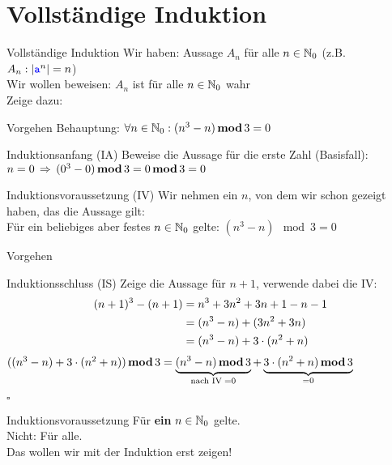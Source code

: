 \section{Vollständige Induktion}

\morescalingdelimiters

\begin{frame}{Vollständige Induktion}
	Wir haben: Aussage $A_n$ für alle $n \in \mathbb{N}_0$ (z.B. $A_n: \left\lvert \hbox{\textcolor{blue}{\texttt{a}}}^n \right\rvert = n$) \\
	Wir wollen beweisen: $A_n$ ist für alle $n \in \mathbb{N}_0$ wahr \\[0.5em]
	Zeige dazu: 
\end{frame}

\begin{frame}{Vorgehen}
	Behauptung: $\forall n \in \mathbb{N}_0: (n^3 - n) \mathop{\textbf{mod}} 3 = 0$
	\begin{block}{Induktionsanfang (IA)}
		Beweise die Aussage für die erste Zahl (Basisfall):\\
		$n = 0 \impl (0^3 - 0) \mod 3 = 0 \mod 3 = 0$
	\end{block}
	\begin{block}{Induktionsvoraussetzung (IV)}
		Wir nehmen ein $n$, von dem wir schon gezeigt haben, das die Aussage gilt:\\
		Für ein beliebiges aber festes $n \in \mathbb{N}_0$ gelte: $(n^3 - n) \mod 3 = 0$
	\end{block}
\end{frame}

\begin{frame}{Vorgehen}
	\begin{block}{Induktionsschluss (IS)}
		Zeige die Aussage für $n+1$, verwende dabei die IV:\\
		\begin{align*}
			(n+1)^3 - (n+1) &= n^3 + 3n^2 + 3n + 1 - n - 1\\
			&= (n^3 - n) + (3n^2 + 3n)\\
			&= (n^3-n) + 3 \cdot (n^2 + n)
		\end{align*}
		$((n^3-n) + 3 \cdot (n^2 + n)) \mathop{\textbf{mod}} 3 = \underbrace{(n^3-n) \mathop{\textbf{mod}} 3}_{\text{nach IV\;} = 0} + \underbrace{3 \cdot (n^2 + n) \mathop{\textbf{mod}} 3}_{= 0}$
	\end{block}
	{$\square$ }
\end{frame}

\begin{frame}{Induktionsvoraussetzung}
	\Huge \centering
	Für \textbf{ein} $n \in \mathbb{N}_0$ gelte.\\
	\bigskip
	{ \LARGE
	Nicht: Für alle.\\
	Das wollen wir mit der Induktion erst zeigen!
	}
\end{frame}

